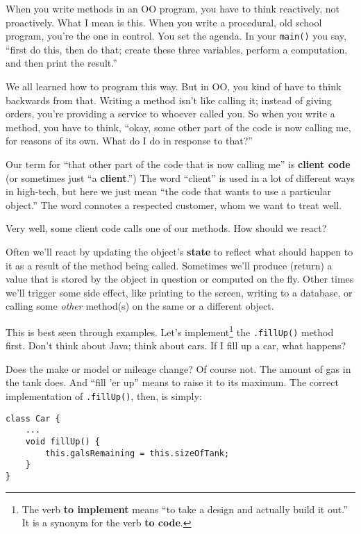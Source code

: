 When you write methods in an OO program, you have to think reactively, not
proactively. What I mean is this. When you write a procedural, old school
program, you're the one in control. You set the agenda. In your
\texttt{main()} you say, ``first do this, then do that; create these three
variables, perform a computation, and then print the result.''

We all learned how to program this way. But in OO, you kind of have to think
backwards from that. Writing a method isn't like calling it; instead of giving
orders, you're providing a service to whoever called you. So when you write a
method, you have to think, ``okay, some other part of the code is now calling
me, for reasons of its own. What do I do in response to that?''

Our term for ``that other part of the code that is now calling me'' is
\textbf{client code} (or sometimes just ``a \textbf{client}.'') The word
``client'' is used in a lot of different ways in high-tech, but here we just
mean ``the code that wants to use a particular object.'' The word connotes a
respected customer, whom we want to treat well.

Very well, some client code calls one of our methods. How should we react?

Often we'll react by updating the object's \textbf{state} to reflect what
should happen to it as a result of the method being called. Sometimes we'll
produce (return) a value that is stored by the object in question or
computed on the fly. Other times we'll trigger some side effect, like printing
to the screen, writing to a database, or calling some \textit{other} method(s)
on the same or a different object.

This is best seen through examples. Let's implement\footnote{The verb
\textbf{to implement} means ``to take a design and actually build it out.'' It
is a synonym for the verb \textbf{to code}.} the \texttt{.fillUp()} method
first. Don't think about Java; think about cars. If I fill up a car, what
happens?

Does the make or model or mileage change? Of course not. The amount of gas in
the tank does. And ``fill 'er up'' means to raise it to its maximum. The
correct implementation of \texttt{.fillUp()}, then, is simply:

\begin{Verbatim}[samepage=true,fontsize=\scriptsize,frame=single]
class Car {
    ...
    void fillUp() {
        this.galsRemaining = this.sizeOfTank;
    }
}
\end{Verbatim}

